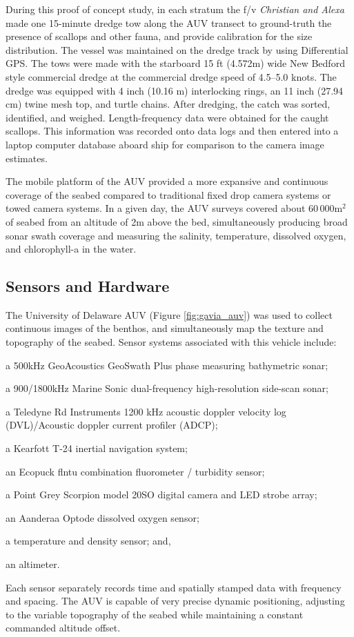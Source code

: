 \documentclass {udthesis}
\begin{document}
During this proof of concept study, in each stratum the f/v
\textit{Christian and Alexa} made one 15-minute dredge tow along the AUV 
transect to ground-truth the presence of scallops and other fauna, 
and provide calibration for the size distribution.  The vessel was maintained 
on the dredge track by using Differential GPS.  
The tows were made with the starboard 15 ft 
(4.572\;m)
wide New Bedford style commercial dredge at the commercial dredge speed of 4.5--5.0 knots.
The dredge was equipped with 4 inch (10.16 m) interlocking rings, 
an 11 inch (27.94 cm) twine mesh top, and turtle chains.
After dredging, the catch was sorted, identified, and weighed.  
Length-frequency data were obtained for the caught scallops.  
This information was recorded onto data logs and then entered into a laptop computer database aboard ship for comparison to the camera image estimates.

The mobile platform of the AUV provided a more expansive and continuous coverage 
of the seabed compared to traditional fixed drop camera systems or towed camera systems. 
In a given day, the AUV surveys covered about $60\,000$\;m$^2$ of seabed 
from an altitude of 2\;m above the bed, simultaneously producing broad sonar 
swath coverage and measuring the salinity, temperature, dissolved oxygen, and 
chlorophyll-a  in the water.


\subsection{Sensors and Hardware}
\label{section:equipment}

The University of Delaware AUV (Figure \ref{fig:gavia_auv}) was used to collect 
continuous images of the benthos, and simultaneously map the texture and topography of 
the seabed. Sensor systems associated with this vehicle include: \begin{enumerate*}[label=(\arabic*):, start=1] 
\item a 500\;kHz GeoAcoustics GeoSwath Plus phase measuring bathymetric 
sonar; \item a 900/1800\;kHz Marine Sonic dual-frequency high-resolution 
side-scan sonar; 
\item a Teledyne Rd Instruments 1200 kHz acoustic doppler velocity log (DVL)/Acoustic doppler current profiler (ADCP); 
\item a Kearfott T-24 inertial navigation system; 
\item an Ecopuck flntu combination fluorometer / turbidity sensor; 
\item a Point Grey Scorpion model 20SO digital camera and LED strobe array; 
\item an Aanderaa Optode dissolved oxygen sensor; 
\item a temperature and density sensor; and, \item an altimeter. \end{enumerate*} 
Each sensor separately records time and spatially stamped data with frequency and spacing.
The AUV is capable of very precise dynamic positioning, adjusting to the variable 
topography of the seabed while maintaining a constant commanded altitude offset.
\end{document}
